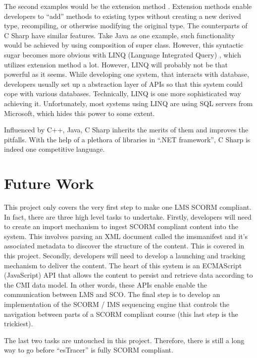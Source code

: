 The second examples would be the extension method \cite{c_sharp_extension_method}. Extension methods enable developers to ``add'' methods to existing 
types without creating a new derived type, recompiling, or otherwise modifying the original type. The counterparts of C Sharp have similar features. 
Take Java as one example, such functionality would be achieved by using composition of super class. However, this syntactic sugar becomes more 
obvious with LINQ (Language Integrated Query) \cite{linq}, which utilizes extension method a lot. However, LINQ will probably not be that powerful as 
it seems. While developing one system, that interacts with database, developers usually set up a abstraction layer of APIs so that this system could 
cope with various databases. Technically, LINQ is one more sophisticated way achieving it. Unfortunately, most systems using LINQ are using SQL 
servers from Microsoft, which hides this power to some extent.

Influenced by C++, Java, C Sharp inherits the merits of them and improves the pitfalls. With the help of a plethora of libraries in ``.NET 
framework'', C Sharp is indeed one competitive language.
\section{Future Work}
This project only covers the very first step to make one LMS SCORM compliant. In fact, there are three high level tasks to undertake. Firstly, 
developers will need to create an import mechanism to ingest SCORM compliant content into the system. This involves parsing an XML document called 
the imsmanifest and it's associated metadata to discover the structure of the content. This is covered in this project. Secondly, developers will 
need to develop a launching and tracking mechanism to deliver the content. The heart of this system is an ECMAScript (JavaScript) API that allows the 
content to persist and retrieve data according to the CMI data model. In other words, these APIs enable enable the communication between LMS and SCO. 
The final step is to develop an implementation of the SCORM / IMS sequencing engine that controls the navigation between parts of a SCORM compliant 
course (this last step is the trickiest).

The last two tasks are untouched in this project. Therefore, there is still a long way to go before ``esTracer'' is fully SCORM compliant.
